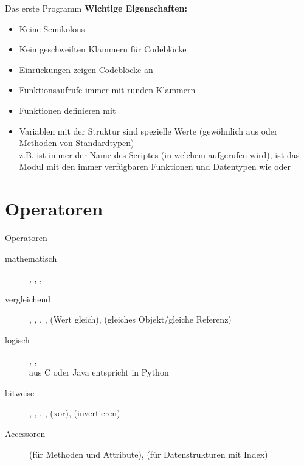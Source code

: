 \begin{frame}[fragile]{Das erste Programm}
	\textbf{Wichtige Eigenschaften:}
	\begin{itemize}
	    \item Keine Semikolons
	    \item Kein geschweiften Klammern für Codeblöcke
	    \item Einrückungen zeigen Codeblöcke an
	    \item Funktionsaufrufe immer mit runden Klammern
	    \item Funktionen definieren mit 
	    \item Variablen mit der Struktur  sind spezielle Werte (gewöhnlich aus  oder Methoden von Standardtypen)\\
	      z.B.  ist immer der Name des Scriptes (in welchem  aufgerufen wird),
	       ist das Modul mit den immer verfügbaren Funktionen und Datentypen wie  oder 
	\end{itemize}
\end{frame}


\section{Operatoren}
\begin{frame}[fragile]{Operatoren}
	\begin{description}
	    \item[mathematisch] \codeline{+}, \codeline{-}, \codeline{*}, \codeline{/}
	    \item[vergleichend] \codeline{<}, \codeline{>}, \codeline{<=}, \codeline{>=}, \codeline{==} (Wert gleich),  (gleiches Objekt/gleiche Referenz)
	    \item[logisch] , , \\  aus C oder Java entspricht  in Python
	    \item[bitweise] \codeline{&}, \codeline{\|}, \codeline{\<\<}, \codeline{\>\>}, \codeline{\^} (xor), \codeline{\~} (invertieren)
	    \item[Accessoren]  (für Methoden und Attribute), \codeline{[]} (für Datenstrukturen mit Index)
	\end{description}
\end{frame}


